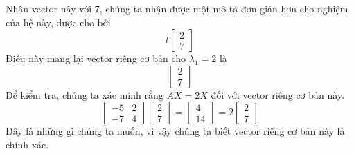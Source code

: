 Nhân vector này với 7, chúng ta nhận được một mô tả đơn giản hơn cho nghiệm của hệ này, được cho bởi
\begin{equation*}
t\begin{bmatrix}2\\ 7\end{bmatrix}
\end{equation*}
Điều này mang lại vector riêng cơ bản cho $\lambda_{1}=2$ là
\begin{equation*}
\begin{bmatrix}2\\ 7\end{bmatrix}
\end{equation*}
Để kiểm tra, chúng ta xác minh rằng $AX=2X$ đối với vector riêng cơ bản này.
\begin{equation*}
\begin{bmatrix}-5&2\\ -7&4\end{bmatrix}\begin{bmatrix}2\\ 7\end{bmatrix}=\begin{bmatrix}4\\ 14\end{bmatrix}=2\begin{bmatrix}2\\ 7\end{bmatrix}
\end{equation*}
Đây là những gì chúng ta muốn, vì vậy chúng ta biết vector riêng cơ bản này là chính xác.

